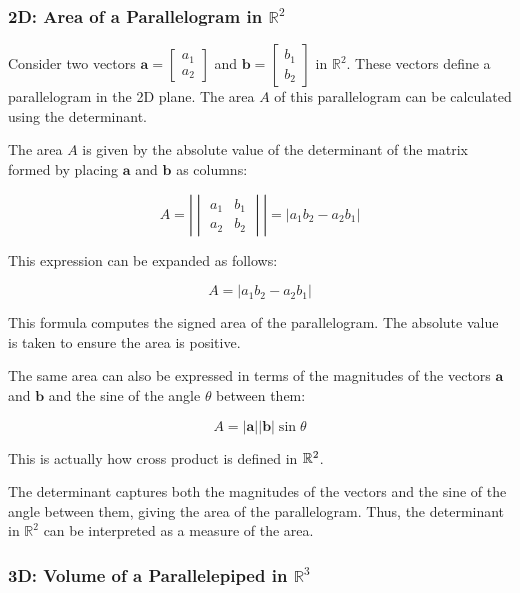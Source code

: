 \documentclass[12pt,a4paper]{article}
\begin{document}
\subsubsection*{2D: Area of a Parallelogram in \(\mathbb{R}^2\)}

Consider two vectors \(\mathbf{a} = \begin{bmatrix} a_1 \\ a_2 \end{bmatrix}\) and \(\mathbf{b} = \begin{bmatrix} b_1 \\ b_2 \end{bmatrix}\) in \(\mathbb{R}^2\). These vectors define a parallelogram in the 2D plane. The area \(A\) of this parallelogram can be calculated using the determinant.

The area \(A\) is given by the absolute value of the determinant of the matrix formed by placing \(\mathbf{a}\) and \(\mathbf{b}\) as columns:

\[
A = \left|\begin{vmatrix} a_1 & b_1 \\ a_2 & b_2 \end{vmatrix}\right| = \left|a_1b_2 - a_2b_1\right|
\]

This expression can be expanded as follows:

\[
A = \left| a_1 b_2 - a_2 b_1 \right|
\]

This formula computes the signed area of the parallelogram. The absolute value is taken to ensure the area is positive.

The same area can also be expressed in terms of the magnitudes of the vectors \(\mathbf{a}\) and \(\mathbf{b}\) and the sine of the angle \(\theta\) between them:

\[
A = |\mathbf{a}| |\mathbf{b}| \sin\theta
\]

\begin{remark}
    This is actually how cross product is defined in $\mathbb{R}^2$.
\end{remark}

The determinant captures both the magnitudes of the vectors and the sine of the angle between them, giving the area of the parallelogram. Thus, the determinant in \(\mathbb{R}^2\) can be interpreted as a measure of the area.

\subsubsection*{3D: Volume of a Parallelepiped in \(\mathbb{R}^3\)}
\end{document}
